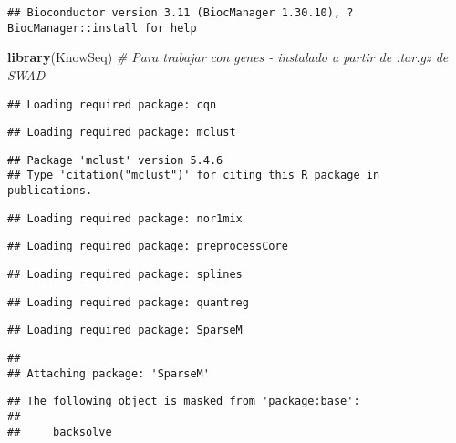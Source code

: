 \documentclass[
]{article}
\newenvironment{Shaded}{\begin{snugshade}}{\end{snugshade}}
\newcommand{\CommentTok}[1]{\textcolor[rgb]{0.56,0.35,0.01}{\textit{#1}}}
\newcommand{\KeywordTok}[1]{\textcolor[rgb]{0.13,0.29,0.53}{\textbf{#1}}}
\newcommand{\NormalTok}[1]{#1}
\begin{document}
\begin{verbatim}
## Bioconductor version 3.11 (BiocManager 1.30.10), ?BiocManager::install for help
\end{verbatim}

\begin{Shaded}
\begin{Highlighting}[]
\KeywordTok{library}\NormalTok{(KnowSeq)     }\CommentTok{# Para trabajar con genes - instalado a partir de .tar.gz de SWAD}
\end{Highlighting}
\end{Shaded}

\begin{verbatim}
## Loading required package: cqn
\end{verbatim}

\begin{verbatim}
## Loading required package: mclust
\end{verbatim}

\begin{verbatim}
## Package 'mclust' version 5.4.6
## Type 'citation("mclust")' for citing this R package in publications.
\end{verbatim}

\begin{verbatim}
## Loading required package: nor1mix
\end{verbatim}

\begin{verbatim}
## Loading required package: preprocessCore
\end{verbatim}

\begin{verbatim}
## Loading required package: splines
\end{verbatim}

\begin{verbatim}
## Loading required package: quantreg
\end{verbatim}

\begin{verbatim}
## Loading required package: SparseM
\end{verbatim}

\begin{verbatim}
## 
## Attaching package: 'SparseM'
\end{verbatim}

\begin{verbatim}
## The following object is masked from 'package:base':
## 
##     backsolve
\end{verbatim}
\end{document}
